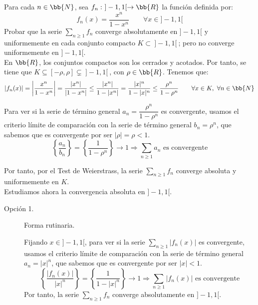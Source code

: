 \begin{ejercicio}
    Para cada $n\in \bb{N}$, sea $f_n:~]-1,1[ \to \bb{R}$ la función definida por:
    \begin{equation*}
        f_n(x) = \frac{x^n}{1-x^n} \qquad \forall x\in]-1,1[
    \end{equation*}
    Probar que la serie $\sum\limits_{n\geq 1}f_n$ converge absolutamente en $]-1,1[$ y uniformemente
    en cada conjunto compacto $K\subset~]-1,1[~$; pero no converge uniformemente en $]-1,1[$.\\
    
    En $\bb{R}$, los conjuntos compactos son los cerrados y acotados. Por tanto, se tiene que $K\subseteq [-\rho, \rho]\subsetneq ~]-1,1[~$, con $\rho\in \bb{R}$. Tenemos que:
    \begin{equation*}
        |f_n(x)| = \left|\frac{x^n}{1-x^n}\right| = \frac{|x^n|}{|1-x^n|} \leq \frac{|x^n|}{1-|x^n|}
        = \frac{|x|^n}{1-|x|^n} \leq \frac{\rho^n}{1-\rho^n} \qquad \forall x\in K,~\forall n\in \bb{N}
    \end{equation*}

    Para ver si la serie de término general $a_n = \dfrac{\rho^n}{1-\rho^n}$ es convergente,
    usamos el criterio límite de comparación con la serie de término general $b_n = \rho^n$, que sabemos que es convergente por ser $|\rho|=\rho < 1$.
    \begin{equation*}
        \left\{\frac{a_n}{b_n}\right\}
        = \left\{\frac{1}{1-\rho^n}\right\} \to 1 \Longrightarrow \sum_{n\geq 1}a_n \text{ es convergente}
    \end{equation*}

    Por tanto, por el Test de Weierstrass, la serie $\sum\limits_{n\geq 1}f_n$ converge absoluta y uniformemente en $K$.\\

    Estudiamos ahora la convergencia absoluta en $]-1,1[$.
    \begin{description}
        \item[Opción 1.] Forma rutinaria.
        
        Fijando $x\in ]-1,1[$, para ver si
        la serie $\sum\limits_{n\geq 1}|f_n(x)|$ es convergente, usamos el criterio límite de comparación
        con la serie de término general $a_n = |x|^n$, que sabemos que es convergente por ser $|x|<1$.
        \begin{equation*}
            \left\{\frac{|f_n(x)|}{|x|^n}\right\} = \left\{\frac{1}{1-|x|^n}\right\}\to 1 \Longrightarrow \sum_{n\geq 1}|f_n(x)| \text{ es convergente}
        \end{equation*}
        Por tanto, la serie $\sum\limits_{n\geq 1}f_n$ converge absolutamente en $]-1,1[$.


\end{description}
\end{ejercicio}
